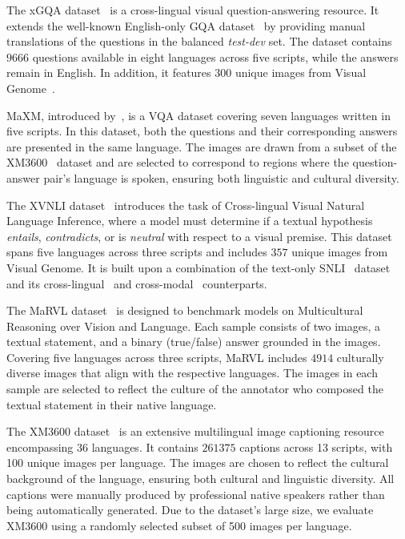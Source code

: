  The xGQA dataset~\citep{pfeiffer-etal-2022-xgqa} is a cross-lingual visual question-answering resource. It extends the well-known English-only GQA dataset~\citep{hudson_gqa_2019} by providing manual translations of the questions in the balanced \textit{test-dev} set. The dataset contains $9666$ questions available in eight languages across five scripts, while the answers remain in English. In addition, it features $300$ unique images from Visual Genome~\citep{krishna_visual_2017}.

%
%
MaXM, introduced by~\citet{changpinyo-etal-2023-maxm}, is a VQA dataset covering seven languages written in five scripts. In this dataset, both the questions and their corresponding answers are presented in the same language. The images are drawn from a subset of the XM3600~\citep{thapliyal_xm3600_2022} dataset and are selected to correspond to regions where the question-answer pair’s language is spoken, ensuring both linguistic and cultural diversity.

%
%
The XVNLI dataset~\citep{bugliarello-etal-2022-iglue} introduces the task of Cross-lingual Visual Natural Language Inference, where a model must determine if a textual hypothesis \textit{entails}, \textit{contradicts}, or is \textit{neutral} with respect to a visual premise. This dataset spans five languages across three scripts and includes $357$ unique images from Visual Genome. It is built upon a combination of the text-only SNLI~\citep{bowman_large_2015} dataset and its cross-lingual~\citep{agic_cli_2018} and cross-modal~\citep{xie_visual_entailment_2019} counterparts.

%
%
The MaRVL dataset~\citep{liu-etal-2021-visually} is designed to benchmark models on Multicultural Reasoning over Vision and Language. Each sample consists of two images, a textual statement, and a binary (true/false) answer grounded in the images. Covering five languages across three scripts, MaRVL includes $4914$ culturally diverse images that align with the respective languages. The images in each sample are selected to reflect the culture of the annotator who composed the textual statement in their native language.

%
%
The XM3600 dataset~\citep{thapliyal_xm3600_2022} is an extensive multilingual image captioning resource encompassing 36 languages. It contains $261375$ captions across 13 scripts, with 100 unique images per language. The images are chosen to reflect the cultural background of the language, ensuring both cultural and linguistic diversity. All captions were manually produced by professional native speakers rather than being automatically generated. Due to the dataset's large size, we evaluate XM3600 using a randomly selected subset of 500 images per language.

